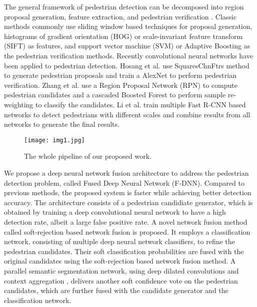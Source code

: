 \documentclass[10pt,letterpaper]{article}
\begin{document}
The general framework of pedestrian detection can be decomposed into region proposal generation, feature extraction, and pedestrian verification \cite{pedsurvey}. Classic methods commonly use sliding window based techniques for proposal generation, histograms of gradient orientation (HOG) \cite{HOG} or scale-invariant feature transform (SIFT) \cite{SIFT} as features, and support vector machine (SVM) \cite{svm} or Adaptive Boosting \cite{adaboost} as the pedestrian verification methods. Recently convolutional neural networks have been applied to pedestrian detection. Hosang et al. \cite{SCF+AlexNet} use SquaresChnFtrs \cite{tenyears} method to generate pedestrian proposals and train a AlexNet \cite{alexnet} to perform pedestrian verification. Zhang et al. \cite{rpn} use a Region Proposal Network (RPN) \cite{fasterrcnn} to compute pedestrian candidates and a cascaded Boosted Forest \cite{bf} to perform sample re-weighting to classify the candidates. Li et al. \cite{safcnn} train multiple Fast R-CNN \cite{fastrcnn} based networks to detect pedestrians with different scales and combine results from all networks to generate the final results.

\begin{figure*}
\begin{center}
   \texttt{[image: img1.jpg]}
\end{center}
   \caption{The whole pipeline of our proposed work.}
\label{fig:short}
\end{figure*}

We propose a deep neural network fusion architecture to address the pedestrian detection problem, called Fused Deep Neural Network (F-DNN). Compared to previous methods, the proposed system is faster while achieving better detection accuracy. The architecture consists of a pedestrian candidiate generator, which is obtained by training a deep convolutional neural network to have a high detection rate, albeit a large false positive rate. A novel network fusion method called soft-rejection based network fusion is proposed. It employs a classification network, consisting of multiple deep neural network classifiers, to refine the pedestrian candidates. Their soft classification probabilities are fused with the original candidates using the soft-rejection based network fusion method. A parallel semantic segmentation network, using deep dilated convolutions and context aggregation \cite{sspaper}, delivers another soft confidence vote on the pedestrian candidates, which are further fused with the candidate generator and the classification network.   
\end{document}
